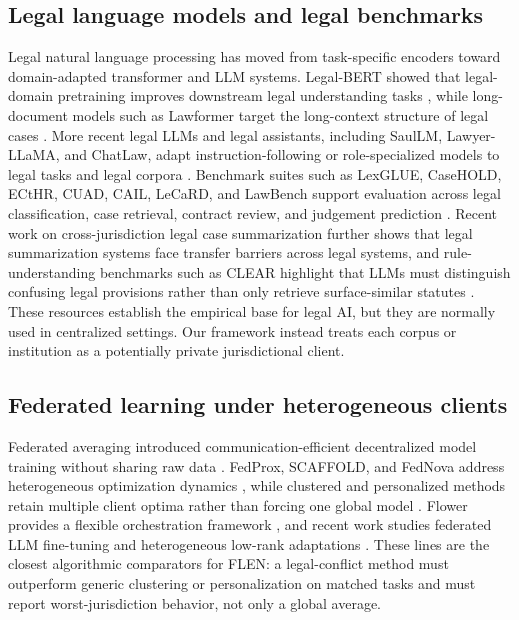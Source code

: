 \documentclass[a4paper,fleqn]{cas-sc}
\begin{document}
\subsection{Legal language models and legal benchmarks}
Legal natural language processing has moved from task-specific encoders toward domain-adapted transformer and LLM systems. Legal-BERT showed that legal-domain pretraining improves downstream legal understanding tasks \citep{chalkidis2020legalbert}, while long-document models such as Lawformer target the long-context structure of legal cases \citep{xiao2021lawformer}. More recent legal LLMs and legal assistants, including SaulLM, Lawyer-LLaMA, and ChatLaw, adapt instruction-following or role-specialized models to legal tasks and legal corpora \citep{colombo2024saullm,huang2023lawyerllama,cui2023chatlaw}. Benchmark suites such as LexGLUE, CaseHOLD, ECtHR, CUAD, CAIL, LeCaRD, and LawBench support evaluation across legal classification, case retrieval, contract review, and judgement prediction \citep{chalkidis2022lexglue,zheng2021casehold,chalkidis2019ecthr,hendrycks2021cuad,xiao2018cail,ma2021lecard,fei2023lawbench}. Recent work on cross-jurisdiction legal case summarization further shows that legal summarization systems face transfer barriers across legal systems, and rule-understanding benchmarks such as CLEAR highlight that LLMs must distinguish confusing legal provisions rather than only retrieve surface-similar statutes \citep{tyss2024beyond,xu2025clear}. These resources establish the empirical base for legal AI, but they are normally used in centralized settings. Our framework instead treats each corpus or institution as a potentially private jurisdictional client.

\subsection{Federated learning under heterogeneous clients}

Federated averaging introduced communication-efficient decentralized model training without sharing raw data \citep{mcmahan2017communication}. FedProx, SCAFFOLD, and FedNova address heterogeneous optimization dynamics \citep{li2020fedprox,karimireddy2020scaffold,wang2020fednova}, while clustered and personalized methods retain multiple client optima rather than forcing one global model \citep{sattler2021clustered,li2021ditto}. Flower provides a flexible orchestration framework \citep{beutel2020flower}, and recent work studies federated LLM fine-tuning and heterogeneous low-rank adaptations \citep{Wang2024FLoRAFF,Wu2026ASO,Cheng2025TowardFL}. These lines are the closest algorithmic comparators for FLEN: a legal-conflict method must outperform generic clustering or personalization on matched tasks and must report worst-jurisdiction behavior, not only a global average.
\end{document}
